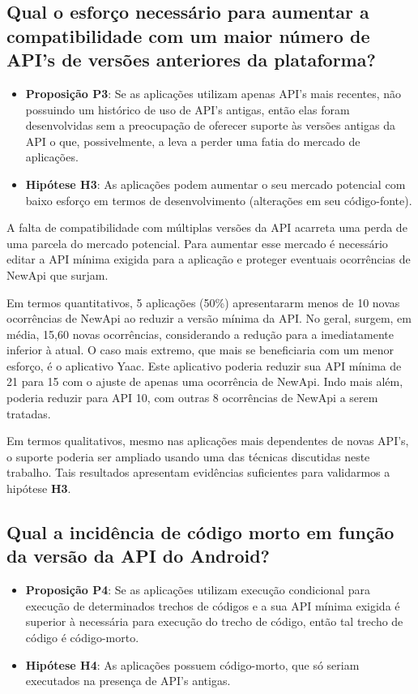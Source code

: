 \subsection{Qual o esforço necessário para aumentar a compatibilidade com um maior
número de API's de versões anteriores da plataforma?} \label{subsec:esforco}

\begin{itemize}
	\item \textbf{Proposição P3}: Se as aplicações utilizam apenas API's mais recentes,
	não possuindo um histórico de uso de API's antigas, então elas foram desenvolvidas
	sem a preocupação de oferecer suporte às versões antigas da API o que, possivelmente,
	a leva a perder uma fatia do mercado de aplicações.
	\item \textbf{Hipótese H3}: As aplicações podem aumentar o seu mercado potencial com
	baixo esforço em termos de desenvolvimento (alterações em seu código-fonte).
\end{itemize}

A falta de compatibilidade com múltiplas versões da API acarreta uma perda de uma
parcela do mercado potencial. Para aumentar esse mercado é necessário editar a API
mínima exigida para a aplicação e proteger eventuais ocorrências de NewApi que surjam.

Em termos quantitativos, 5 aplicações (50\%) apresentararm menos de 10 novas ocorrências 
de NewApi ao reduzir a versão mínima da API. No geral, surgem, em média, 15,60 novas
ocorrências, considerando a redução para a imediatamente inferior à atual. O caso mais
extremo, que mais se beneficiaria com um menor esforço, é o aplicativo Yaac. Este aplicativo
poderia reduzir sua API mínima de 21 para 15 com o ajuste de apenas uma ocorrência de NewApi.
Indo mais além, poderia reduzir para API 10, com outras 8 ocorrências de NewApi a serem tratadas.

Em termos qualitativos, mesmo nas aplicações mais dependentes de novas API's, o suporte
poderia ser ampliado usando uma das técnicas discutidas neste trabalho. Tais resultados
apresentam evidências suficientes para validarmos a hipótese \textbf{H3}. 

\subsection{Qual a incidência de código morto em função da versão da API do Android?} 
\label{subsec:codigo_morto}

\begin{itemize}
	\item \textbf{Proposição P4}: Se as aplicações utilizam execução condicional para
	execução de determinados trechos de códigos e a sua API mínima exigida é superior
	à necessária para execução do trecho de código, então tal trecho de código é código-morto.   
	\item \textbf{Hipótese H4}: As aplicações possuem código-morto, que só seriam executados
	na presença de API's antigas.
\end{itemize}

